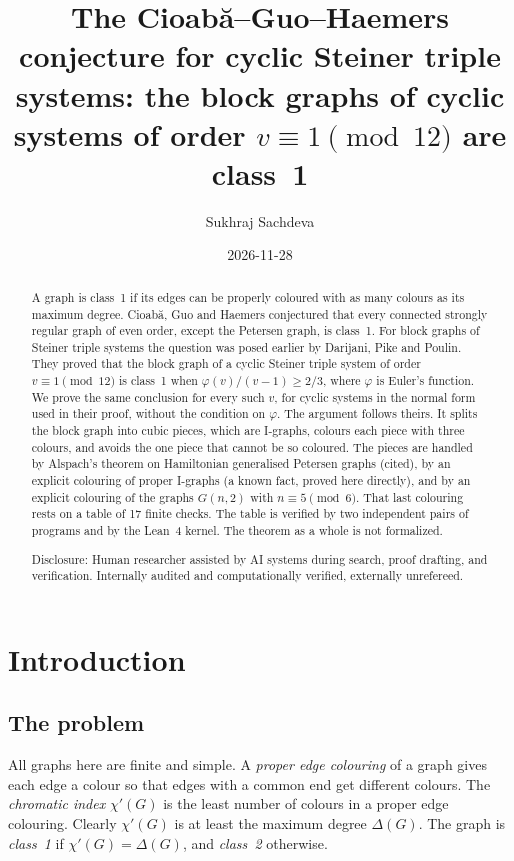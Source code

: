 \documentclass[11pt]{amsart}
\title[The Cioab\u{a}--Guo--Haemers conjecture for cyclic Steiner triple systems]{The Cioab\u{a}--Guo--Haemers conjecture for cyclic Steiner triple systems: the block graphs of cyclic systems of order \(v\equiv 1\pmod{12}\) are class~1}
\author{Sukhraj Sachdeva}
\date{2026-11-28\doiline}
\theoremstyle{plain}
\theoremstyle{definition}
\theoremstyle{remark}
\numberwithin{equation}{section}
\begin{document}
\begin{abstract}
A graph is class~1 if its edges can be properly coloured with as many colours as its maximum degree. Cioab\u{a}, Guo and Haemers conjectured that every connected strongly regular graph of even order, except the Petersen graph, is class~1. For block graphs of Steiner triple systems the question was posed earlier by Darijani, Pike and Poulin. They proved that the block graph of a cyclic Steiner triple system of order \(v\equiv1\pmod{12}\) is class~1 when \(\varphi(v)/(v-1)\ge 2/3\), where \(\varphi\) is Euler's function. We prove the same conclusion for every such \(v\), for cyclic systems in the normal form used in their proof, without the condition on \(\varphi\). The argument follows theirs. It splits the block graph into cubic pieces, which are I-graphs, colours each piece with three colours, and avoids the one piece that cannot be so coloured. The pieces are handled by Alspach's theorem on Hamiltonian generalised Petersen graphs (cited), by an explicit colouring of proper I-graphs (a known fact, proved here directly), and by an explicit colouring of the graphs \(G(n,2)\) with \(n\equiv5\pmod6\). That last colouring rests on a table of 17 finite checks. The table is verified by two independent pairs of programs and by the Lean~4 kernel. The theorem as a whole is not formalized.

Disclosure: Human researcher assisted by AI systems during search, proof drafting, and verification. Internally audited and computationally verified, externally unrefereed.
\end{abstract}

\maketitle

\section{Introduction}\label{sec:intro}

\subsection{The problem}

All graphs here are finite and simple. A \emph{proper edge colouring} of a graph gives each edge a colour so that edges with a common end get different colours. The \emph{chromatic index} \(\chi'(G)\) is the least number of colours in a proper edge colouring. Clearly \(\chi'(G)\) is at least the maximum degree \(\Delta(G)\). The graph is \emph{class~1} if \(\chi'(G)=\Delta(G)\), and \emph{class~2} otherwise.
\end{document}
